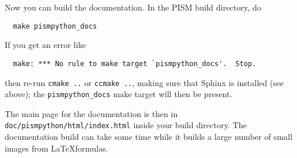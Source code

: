 \documentclass[titlepage,letterpaper,final]{scrartcl}
\begin{document}
Now you can build the documentation.  In the PISM build directory, do
\begin{verbatim}
  make pismpython_docs
\end{verbatim}
If you get an error like
\begin{verbatim}
  make: *** No rule to make target `pismpython_docs'.  Stop.
\end{verbatim}
then re-run \texttt{cmake ..} or  \texttt{ccmake ..}, making sure that Sphinx is installed
(see above); the  \texttt{pismpython_docs} make target will then be present.

The main page for the documentation is then in
 \texttt{doc/pismpython/html/index.html} inside your build directory. The
documentation build can take some time while it
builds a large number of small images from
\LaTeX formulas.
\end{document}
